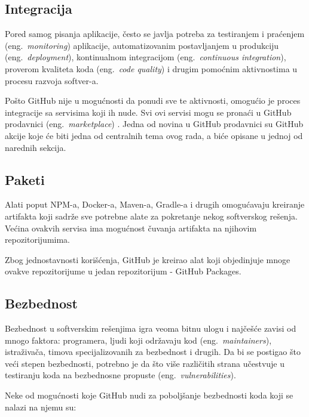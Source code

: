 \documentclass[12pt]{report}
\begin{document}
\subsection{Integracija}
Pored samog pisanja aplikacije, često se javlja potreba za testiranjem i praćenjem (eng.\ \textit{monitoring}) aplikacije, automatizovanim postavljanjem u produkciju (eng.\ \textit{deployment}), kontinualnom integracijom (eng.\ \textit{continuous integration}), proverom kvaliteta koda (eng.\ \textit{code quality}) i drugim pomoćnim aktivnostima u procesu razvoja softver-a.

Pošto GitHub nije u mogućnosti da ponudi sve te aktivnosti, omogućio je proces integracije sa servisima koji ih nude. Svi ovi servisi mogu se pronaći u GitHub prodavnici (eng.\ \textit{marketplace}) \cite{marketplace}. Jedna od novina u GitHub prodavnici su GitHub akcije koje će biti jedna od centralnih tema ovog rada, a biće opisane u jednoj od narednih sekcija.

\subsection{Paketi}
Alati poput NPM-a, Docker-a, Maven-a, Gradle-a i drugih omogućavaju kreiranje artifakta koji sadrže sve potrebne alate za pokretanje nekog softverskog rešenja. Većina ovakvih servisa ima mogućnost čuvanja artifakta na njihovim repozitorijumima.

Zbog jednostavnosti korišćenja, GitHub je kreirao alat koji objedinjuje mnoge ovakve repozitorijume u jedan repozitorijum - GitHub Packages.

\subsection{Bezbednost}
Bezbednost u softverskim rešenjima igra veoma bitnu ulogu i najčešće zavisi od mnogo faktora: programera, ljudi koji održavaju kod (eng.\ \textit{maintainers}), istraživača, timova specijalizovanih za bezbednost i drugih. Da bi se postigao što veći stepen bezbednosti, potrebno je da što više različitih strana učestvuje u testiranju koda na bezbednosne propuste (eng.\ \textit{vulnerabilities}).

Neke od mogućnosti koje GitHub nudi za poboljšanje bezbednosti koda koji se nalazi na njemu su:
\end{document}
